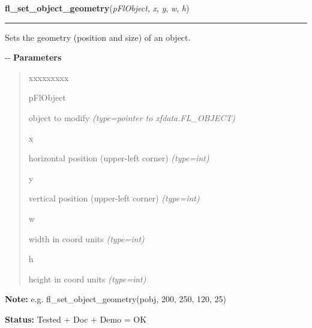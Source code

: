 \hspace{.8\funcindent}\begin{boxedminipage}{\funcwidth}

    \raggedright \textbf{fl\_set\_object\_geometry}(\textit{pFlObject}, \textit{x}, \textit{y}, \textit{w}, \textit{h})

    \vspace{-1.5ex}

    \rule{\textwidth}{0.5\fboxrule}
\setlength{\parskip}{2ex}

Sets the geometry (position and size) of an object.

-{}-
\setlength{\parskip}{1ex}
      \textbf{Parameters}
      \vspace{-1ex}

      \begin{quote}
        \begin{Ventry}{xxxxxxxxx}

          \item[pFlObject]


object to modify
            {\it (type=pointer to xfdata.FL\_OBJECT)}

          \item[x]


horizontal position (upper-left corner)
            {\it (type=int)}

          \item[y]


vertical position (upper-left corner)
            {\it (type=int)}

          \item[w]


width in coord units
            {\it (type=int)}

          \item[h]


height in coord units
            {\it (type=int)}

        \end{Ventry}

      \end{quote}

\textbf{Note:} 
e.g. fl\_set\_object\_geometry(pobj, 200, 250, 120, 25)


\textbf{Status:} 
Tested + Doc + Demo = OK


    \end{boxedminipage}

    \label{xformslib:flbasic:fl_move_object}

